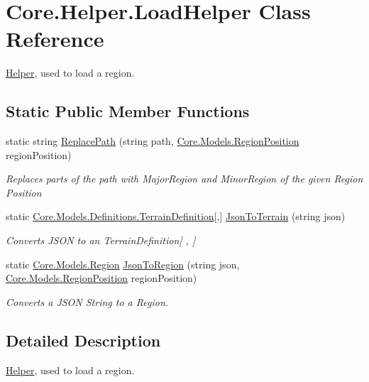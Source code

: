 \hypertarget{classCore_1_1Helper_1_1LoadHelper}{}\section{Core.\+Helper.\+Load\+Helper Class Reference}
\label{classCore_1_1Helper_1_1LoadHelper}


\hyperlink{namespaceCore_1_1Helper}{Helper}, used to load a region.  


\subsection*{Static Public Member Functions}
\begin{DoxyCompactItemize}
\item 
static string \hyperlink{classCore_1_1Helper_1_1LoadHelper_a640d07c856bb1e1b8e8e17666c9cadea}{Replace\+Path} (string path, \hyperlink{classCore_1_1Models_1_1RegionPosition}{Core.\+Models.\+Region\+Position} region\+Position)
\begin{DoxyCompactList}\small\item\em Replaces parts of the path with Major\+Region and Minor\+Region of the given Region Position \end{DoxyCompactList}\item 
static \hyperlink{classCore_1_1Models_1_1Definitions_1_1TerrainDefinition}{Core.\+Models.\+Definitions.\+Terrain\+Definition}\mbox{[},\mbox{]} \hyperlink{classCore_1_1Helper_1_1LoadHelper_a6f20b66dcc8ab52e25f09d0cdc7ebfcd}{Json\+To\+Terrain} (string json)
\begin{DoxyCompactList}\small\item\em Converts J\+S\+O\+N to an Terrain\+Definition\mbox{[} , \mbox{]} \end{DoxyCompactList}\item 
static \hyperlink{classCore_1_1Models_1_1Region}{Core.\+Models.\+Region} \hyperlink{classCore_1_1Helper_1_1LoadHelper_ace39477d290680fce596cf46869b92b6}{Json\+To\+Region} (string json, \hyperlink{classCore_1_1Models_1_1RegionPosition}{Core.\+Models.\+Region\+Position} region\+Position)
\begin{DoxyCompactList}\small\item\em Converts a J\+S\+O\+N String to a Region. \end{DoxyCompactList}\end{DoxyCompactItemize}


\subsection{Detailed Description}
\hyperlink{namespaceCore_1_1Helper}{Helper}, used to load a region. 



